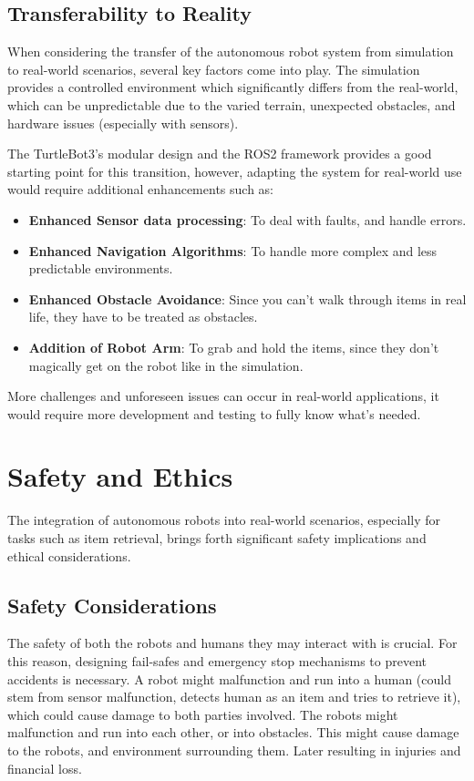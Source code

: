 \documentclass[conference]{IEEEtran}
\begin{document}
\subsection{Transferability to Reality}
When considering the transfer of the autonomous robot system from simulation to real-world scenarios, several key factors come into play. The simulation provides a controlled environment which significantly differs from the real-world, which can be unpredictable due to the varied terrain, unexpected obstacles, and hardware issues (especially with sensors).

The TurtleBot3's modular design and the ROS2 framework provides a good starting point for this transition, however, adapting the system for real-world use would require additional enhancements such as:

\begin{itemize}
    \item \textbf{Enhanced Sensor data processing}: To deal with faults, and handle errors.
    \item \textbf{Enhanced Navigation Algorithms}: To handle more complex and less predictable environments.
    \item \textbf{Enhanced Obstacle Avoidance}: Since you can't walk through items in real life, they have to be treated as obstacles.
    \item \textbf{Addition of Robot Arm}: To grab and hold the items, since they don't magically get on the robot like in the simulation.
\end{itemize}

More challenges and unforeseen issues can occur in real-world applications, it would require more development and testing to fully know what's needed.

\section{Safety and Ethics}
The integration of autonomous robots into real-world scenarios, especially for tasks such as item retrieval, brings forth significant safety implications and ethical considerations.

\subsection{Safety Considerations}
The safety of both the robots and humans they may interact with is crucial. For this reason, designing fail-safes and emergency stop mechanisms to prevent accidents is necessary. 
A robot might malfunction and run into a human (could stem from sensor malfunction, detects human as an item and tries to retrieve it), which could cause damage to both parties involved.
The robots might malfunction and run into each other, or into obstacles. This might cause damage to the robots, and environment surrounding them. Later resulting in injuries and financial loss.  
\end{document}
